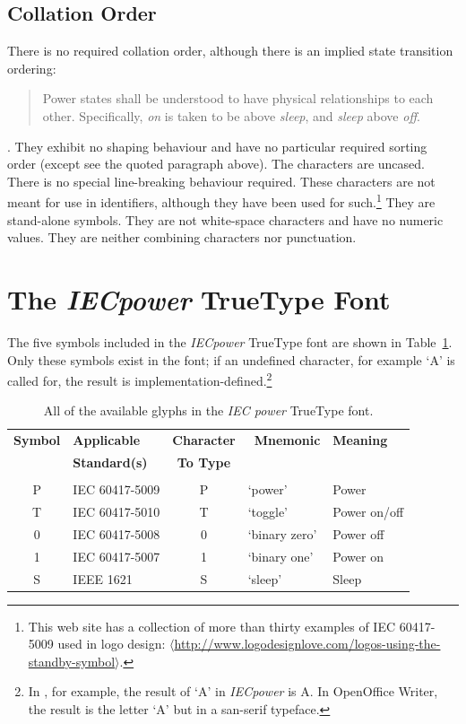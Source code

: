 \documentclass[10pt,a4paper]{article}
\newcommand{\URL}[1]{$\langle$\url{#1}$\rangle$}
\newcommand{\IEC}[1]{{\fontspec{IECpower}#1}}
\begin{document}
\subsection{Collation Order}\label{section:collation-order}

There is no required collation order, although there is an implied state transition
ordering:

\begin{quote}
Power states shall be understood to have physical relationships to each other.
Specifically, \emph{on} is taken to be above \emph{sleep}, and \emph{sleep} above
\emph{off}.
\end{quote}

\noindent \cite[\S 4.4, emphasis in original]{IEEE1621}. They exhibit no shaping
behaviour and have no particular required sorting order (except see the quoted
paragraph above). The characters are uncased. There is no special line-breaking
behaviour required. These characters are not meant for use in identifiers,
although they have been used for such.\footnote{This web site has a collection
of more than thirty examples of IEC 60417-5009 used in logo design:
\URL{http://www.logodesignlove.com/logos-using-the-standby-symbol}.} They are
stand-alone symbols.  They are not white-space characters and have no numeric
values. They are neither combining characters nor punctuation.

\section{The \emph{IECpower} TrueType Font}

The five symbols included in the \emph{IECpower} TrueType font are shown in
Table~\ref{table:symbols}. Only these symbols exist in the font; if an undefined
character, for example `A' is called for, the result is
implementation-defined.\footnote{In , for example, the result of
`A' in \emph{IECpower} is \IEC{A}.  In OpenOffice Writer, the result is the
letter `A' but in a san-serif typeface.}

\begin{table}[htbp]
	\centering
	\begin{tabular}{clcll}
		\textbf{Symbol} & \textbf{Applicable} & \textbf{Character} & \
			\textbf{Mnemonic} & \textbf{Meaning} \\
		& \textbf{Standard(s)} & \textbf{To Type} \\
		\hline \\
		\IEC{P} & IEC 60417-5009 & P & `power'       & Power        \\
		\IEC{T} & IEC 60417-5010 & T & `toggle'      & Power on/off \\
		\IEC{0} & IEC 60417-5008 & 0 & `binary zero' & Power off    \\
		\IEC{1} & IEC 60417-5007 & 1 & `binary one'  & Power on     \\
		\IEC{S} & IEEE 1621      & S & `sleep'       & Sleep        \\
    \end{tabular}
    \caption{All of the available glyphs in the \emph{IEC power} TrueType font.}
    \label{table:symbols} %
\end{table}
\end{document}
